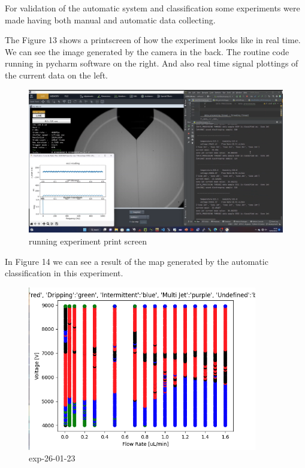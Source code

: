         For validation of the automatic system and classification some experiments were made having both manual and automatic data collecting.

        The Figure 13 shows a printscreen of how the experiment looks like in real time.
        We can see the image generated by the camera in the back.
        The routine code running in pycharm software on the right.
        And also real time signal plottings of the current data on the left.

        \begin{figure}[H]
            \center
            \includegraphics[width=17cm]{Figuras/19:03/axs1.png}
            \caption{running experiment print screen}
        \end{figure}

        In Figure 14 we can see a result of the map generated by the automatic classification in this experiment.

        \begin{figure}[H]
            \center
            \includegraphics[width=10cm]{Figuras/report3/map-exp-26-01.png}
            \caption{ exp-26-01-23 }
        \end{figure}

